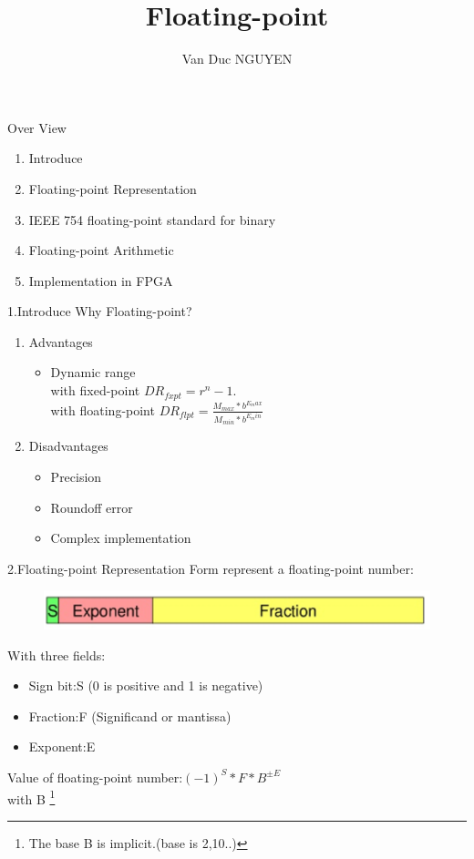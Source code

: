 \documentclass[11pt]{beamer}
\title{Floating-point}
\author{Van Duc NGUYEN}
\institute{\textbf{Viettel IC Design}}
\date{}
\begin{document}
\begin{frame}
\titlepage
\end{frame}
\begin{frame}[t]{Over View}
\begin{enumerate}
\item Introduce
\item Floating-point Representation
\item IEEE 754 floating-point standard for binary
\item Floating-point Arithmetic
\item Implementation in FPGA
\end{enumerate}
\end{frame}
\begin{frame}[t]{1.Introduce}
Why Floating-point?
\begin{enumerate}
\item Advantages
\begin{itemize}
\item Dynamic range\\
with fixed-point $DR_{fxpt}=r^n-1$.\\
with floating-point $DR_{flpt}=\frac{M_{max}*b^{E_max}}{M_{min}*b^{E_min}}$
\end{itemize}
\item Disadvantages
\begin{itemize}
\item Precision
\item Roundoff error
\item Complex implementation
\end{itemize}
\end{enumerate}
\end{frame}
\begin{frame}[t]{2.Floating-point Representation}
Form represent a floating-point number:\\
\begin{center}
    \begin{figure}[htp]
    \begin{center}
     \includegraphics[scale=.5]{image/fig21}
    \end{center}
    \label{reffig21}
    \end{figure}
\end{center}
With three fields:
\begin{itemize}
\item Sign bit:S (0 is positive and 1 is negative)
\item Fraction:F (Significand or mantissa)
\item Exponent:E
\end{itemize}
Value of floating-point number:{$(-1)^S*{F}*B^{\pm{E}}$}\\
with B
\footnote{The base B is implicit.(base is 2,10..)}
\end{frame}
\end{document}
